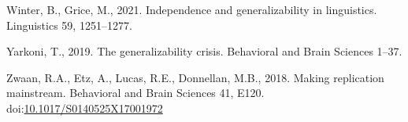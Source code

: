 \documentclass[]{elsarticle} %
\newlength{\cslhangindent}
\newlength{\cslentryspacingunit} %
\newenvironment{CSLReferences}[2] %
 {%
  \setlength{\parindent}{0pt}
  \ifodd #1
  \let\oldpar\par
  \def\par{\hangindent=\cslhangindent\oldpar}
  \fi
  \setlength{\parskip}{#2\cslentryspacingunit}
 }%
 {}
\begin{document}
\begin{CSLReferences}{1}{0}
\leavevmode\hypertarget{ref-winter2021independence}{}%
Winter, B., Grice, M., 2021. Independence and generalizability in linguistics. Linguistics 59, 1251--1277.

\leavevmode\hypertarget{ref-yarkoni2019generalizability}{}%
Yarkoni, T., 2019. The generalizability crisis. Behavioral and Brain Sciences 1--37.

\leavevmode\hypertarget{ref-zwaan_making_2018}{}%
Zwaan, R.A., Etz, A., Lucas, R.E., Donnellan, M.B., 2018. Making replication mainstream. Behavioral and Brain Sciences 41, E120. doi:\href{https://doi.org/10.1017/S0140525X17001972}{10.1017/S0140525X17001972}

\end{CSLReferences}
\end{document}
